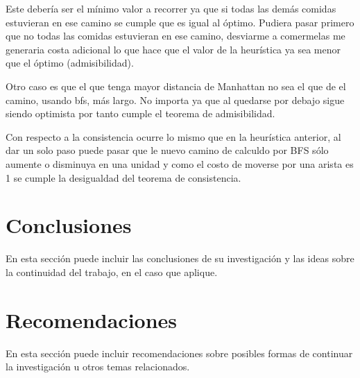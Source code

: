 \documentclass[a4paper,10pt,twocolumn]{article}
\begin{document}
Este debería ser el mínimo valor a recorrer ya que si todas las demás comidas estuvieran en ese camino se cumple que es igual al óptimo. 
Pudiera pasar primero que no todas las comidas estuvieran en ese camino, desviarme a comermelas me generaria costa adicional lo que hace que el valor de la heurística ya sea menor que el óptimo (admisibilidad).
 
Otro caso es que el que tenga mayor distancia de Manhattan no sea el que de el camino, usando bfs, más largo. No importa ya que al quedarse por debajo sigue siendo optimista por tanto cumple el teorema de admisibilidad.  

Con respecto a la consistencia ocurre lo mismo que en la heurística anterior, al dar un solo paso puede pasar que le nuevo camino de calculdo por BFS sólo aumente o disminuya en una unidad y como el costo de moverse por una arista es 1 se cumple la desigualdad del teorema de consistencia.  


 




\section{Conclusiones}\label{sec:conc}

  En esta sección puede incluir las conclusiones de su investigación y las ideas
  sobre la continuidad del trabajo, en el caso que aplique.




\section{Recomendaciones}\label{sec:rec}

  En esta sección puede incluir recomendaciones sobre posibles formas de continuar
  la investigación u otros temas relacionados.
\end{document}
